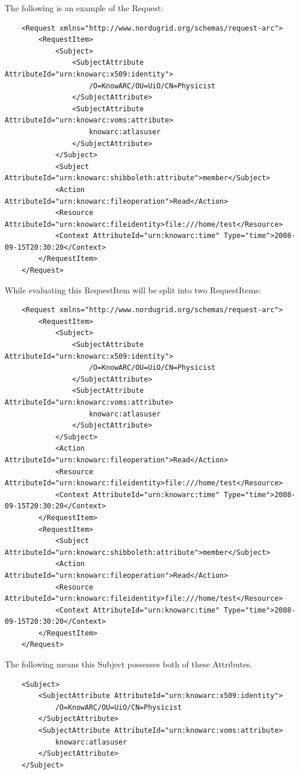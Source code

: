\documentclass{article}                            %
\begin{document}
The following is an example of the Request:

\begin{verbatim}
    <Request xmlns="http://www.nordugrid.org/schemas/request-arc">
        <RequestItem>
            <Subject>
                <SubjectAttribute AttributeId="urn:knowarc:x509:identity">
                    /O=KnowARC/OU=UiO/CN=Physicist
                </SubjectAttribute>
                <SubjectAttribute AttributeId="urn:knowarc:voms:attribute>
                    knowarc:atlasuser
                </SubjectAttribute>
            </Subject>
            <Subject AttributeId="urn:knowarc:shibboleth:attribute">member</Subject>
            <Action AttributeId="urn:knowarc:fileoperation">Read</Action>
            <Resource AttributeId="urn:knowarc:fileidentity>file:///home/test</Resource>
            <Context AttributeId="urn:knowarc:time" Type="time">2008-09-15T20:30:20</Context>
        </RequestItem>
    </Request>
\end{verbatim}

While evaluating this RequestItem will be split into two RequestItems:

\begin{verbatim}
    <Request xmlns="http://www.nordugrid.org/schemas/request-arc">
        <RequestItem>
            <Subject>
                <SubjectAttribute AttributeId="urn:knowarc:x509:identity">
                    /O=KnowARC/OU=UiO/CN=Physicist
                </SubjectAttribute>
                <SubjectAttribute AttributeId="urn:knowarc:voms:attribute>
                    knowarc:atlasuser
                </SubjectAttribute>
            </Subject>
            <Action AttributeId="urn:knowarc:fileoperation">Read</Action>
            <Resource AttributeId="urn:knowarc:fileidentity>file:///home/test</Resource>
            <Context AttributeId="urn:knowarc:time" Type="time">2008-09-15T20:30:20</Context>
        </RequestItem>
        <RequestItem>
            <Subject AttributeId="urn:knowarc:shibboleth:attribute">member</Subject>
            <Action AttributeId="urn:knowarc:fileoperation">Read</Action>
            <Resource AttributeId="urn:knowarc:fileidentity>file:///home/test</Resource>
            <Context AttributeId="urn:knowarc:time" Type="time">2008-09-15T20:30:20</Context>
        </RequestItem>
    </Request>
\end{verbatim}

The following means this Subject possesses both of these Attributes.

\begin{verbatim}
    <Subject>
        <SubjectAttribute AttributeId="urn:knowarc:x509:identity">
            /O=KnowARC/OU=UiO/CN=Physicist
        </SubjectAttribute>
        <SubjectAttribute AttributeId="urn:knowarc:voms:attribute>
            knowarc:atlasuser
        </SubjectAttribute>
    </Subject>
\end{verbatim}
\end{document}
